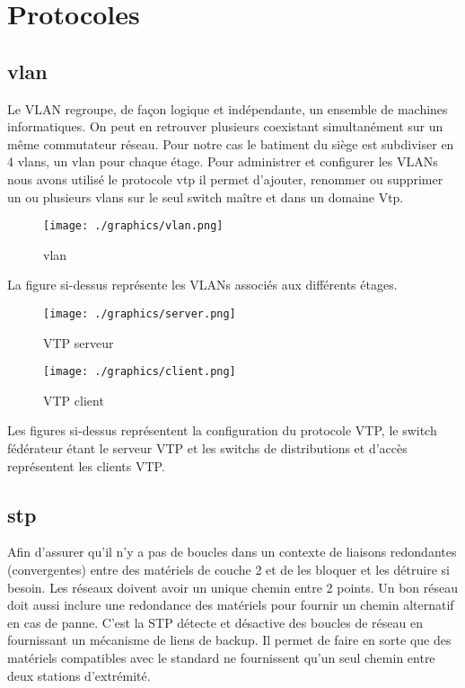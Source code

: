 \documentclass[12pt,a4paper]{report}
\begin{document}
		\newpage		


		\section{Protocoles}
		\subsection{\ac{vlan}}
		Le VLAN regroupe, de façon logique et indépendante, un ensemble de machines informatiques. On peut en retrouver plusieurs coexistant simultanément sur un même commutateur réseau.
		Pour notre cas le batiment du siège est subdiviser en 4 vlans, un \ac{vlan} pour chaque étage.
		Pour administrer et configurer les VLANs nous avons utilisé le protocole \ac{vtp} il permet d'ajouter, renommer ou supprimer un ou plusieurs vlans sur le seul switch maître et dans un domaine Vtp.\\

		
		\begin{figure}[!hbtp]
			\centering
			\texttt{[image: ./graphics/vlan.png]}
			\caption{vlan}
		\end{figure}

		La figure si-dessus représente les VLANs associés aux différents étages.

		\begin{figure}[!hbtp]
			\centering
			\texttt{[image: ./graphics/server.png]}
			\caption{VTP serveur}
		\end{figure}

		\begin{figure}[!hbtp]
			\centering
			\texttt{[image: ./graphics/client.png]}
			\caption{VTP client}
		\end{figure}

		Les figures si-dessus représentent la configuration du protocole VTP, le switch fédérateur étant le serveur VTP et les switchs de distributions et d'accès représentent les clients VTP.

		\newpage


		\subsection{\ac{stp}}
		Afin d'assurer qu'il n'y a pas de boucles dans un contexte de liaisons redondantes (convergentes) entre des matériels de couche 2 et de les bloquer et les détruire si besoin. Les réseaux doivent avoir un unique chemin entre 2 points. Un bon réseau doit aussi inclure une redondance des matériels pour fournir un chemin alternatif en cas de panne. C'est la STP détecte et désactive des boucles de réseau en fournissant un mécanisme de liens de backup. Il permet de faire en sorte que des matériels compatibles avec le standard ne fournissent qu'un seul chemin entre deux stations d'extrémité. 
\end{document}
